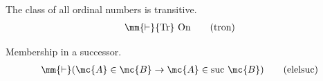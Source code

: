 \begin{lemma} The class of all ordinal numbers is
transitive.  
\begin{align}
\mm{\vdash} {\rm Tr}~ {\rm On}\label{eq:tron}\tag{tron}
\end{align}
\end{lemma}


\begin{lemma} Membership in a successor.  
\begin{align}
\mm{\vdash} ( \mc{A} \in \mc{B} \rightarrow \mc{A} \in {\rm suc}~ \mc{B}
    )\label{eq:elelsuc}\tag{elelsuc}
\end{align}
\end{lemma}



